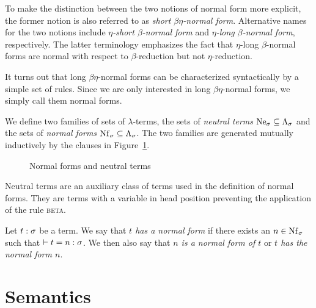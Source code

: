 To make the distinction between the two notions of normal form more explicit, the former notion is also referred to as \textit{short $\beta\eta$-normal form}. Alternative names for the two notions include \textit{$\eta$-short $\beta$-normal form} and \textit{$\eta$-long $\beta$-normal form}, respectively. The latter terminology emphasizes the fact that $\eta$-long $\beta$-normal forms are normal with respect to $\beta$-reduction but not $\eta$-reduction.

It turns out that long $\beta\eta$-normal forms can be characterized syntactically by a simple set of rules. Since we are only interested in long $\beta\eta$-normal forms, we simply call them normal forms.

\begin{defn} \label{def:normal-forms}
We define two families of sets of $\lambda$-terms, the sets of \emph{neutral terms} $\Ne[\sigma] \subs \Tm[\sigma]$ and the sets of \emph{normal forms} $\Nf[\sigma] \subs \Tm[\sigma]$. The two families are generated mutually inductively by the clauses in Figure~\ref{fig:stlc-normal-forms}.
\begin{figure}[ht]
\caption{Normal forms and neutral terms}
\label{fig:stlc-normal-forms}
\end{figure}
\end{defn}

Neutral terms are an auxiliary class of terms used in the definition of normal forms. They are terms with a variable in head position preventing the application of the rule \textsc{beta}.

\begin{defn} \label{def:has-normal-form}
Let $t : \sigma$ be a term. We say that \emph{$t$ has a normal form} if there exists an $n \in \Nf[\sigma]$ such that $\vdash t = n : \sigma$. We then also say that \emph{$n$ is a normal form of $t$} or \emph{$t$ has the normal form $n$}.
\end{defn}

\section{Semantics} \label{sec:stlc-semantics}


